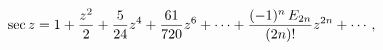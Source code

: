 \[\mathop{\sec\/}\nolimits z=1+\frac{z^{2}}{2}+\frac{5}{24}z^{4}+\frac{61}{720}z%
^{6}+\cdots+\frac{(-1)^{n}\mathop{E_{2n}\/}\nolimits}{(2n)!}z^{2n}+\cdots,\]